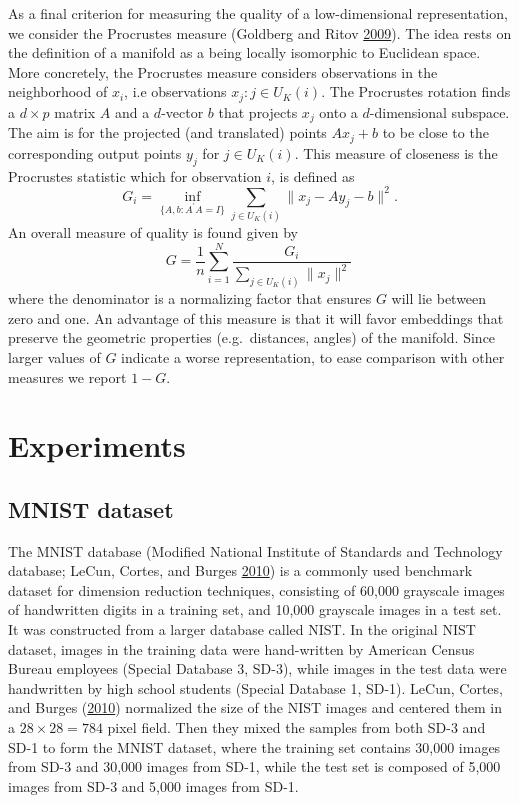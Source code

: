 \documentclass[12pt]{article}
\begin{document}
As a final criterion for measuring the quality of a low-dimensional representation, we consider the Procrustes measure (Goldberg and Ritov \protect\hyperlink{ref-Goldberg2009-tb}{2009}). The idea rests on the definition of a manifold as a being locally isomorphic to Euclidean space. More concretely, the Procrustes measure considers observations in the neighborhood of \(x_i\), i.e observations \(x_j:j\in U_K(i)\). The Procrustes rotation finds a \(d\times p\) matrix \(A\) and a \(d\)-vector \(b\) that projects \(x_j\) onto a \(d\)-dimensional subspace. The aim is for the projected (and translated) points \(Ax_j+b\) to be close to the corresponding output points \(y_j\) for \(j\in U_K(i)\). This measure of closeness is the Procrustes statistic which for observation \(i\), is defined as
\begin{equation}\label{eq:procstats}
  G_i= \inf _{\{A,b: A^{\prime} A=I\}} \sum_{j\in U_K(i)}\|x_{j}-A y_{j}-b\|^{2}.
\end{equation}
An overall measure of quality is found given by
\begin{equation}\label{eq:procmeasure}
  G=\frac{1}{n}\sum\limits_{i=1}^N\frac{G_i}{\sum_{j\in U_K(i)}\|x_{j}\|^{2}}\,
\end{equation}
where the denominator is a normalizing factor that ensures \(G\) will lie between zero and one. An advantage of this measure is that it will favor embeddings that preserve the geometric properties (e.g.~distances, angles) of the manifold. Since larger values of \(G\) indicate a worse representation, to ease comparison with other measures we report \(1-G\).

\hypertarget{experiment}{%
\section{Experiments}\label{experiment}}

\hypertarget{mnist-dataset}{%
\subsection{MNIST dataset}\label{mnist-dataset}}

The MNIST database (Modified National Institute of Standards and Technology database; LeCun, Cortes, and Burges \protect\hyperlink{ref-lecun2010mnist}{2010}) is a commonly used benchmark dataset for dimension reduction techniques, consisting of 60,000 grayscale images of handwritten digits in a training set, and 10,000 grayscale images in a test set. It was constructed from a larger database called NIST. In the original NIST dataset, images in the training data were hand-written by American Census Bureau employees (Special Database 3, SD-3), while images in the test data were handwritten by high school students (Special Database 1, SD-1). LeCun, Cortes, and Burges (\protect\hyperlink{ref-lecun2010mnist}{2010}) normalized the size of the NIST images and centered them in a \(28\times 28=784\) pixel field. Then they mixed the samples from both SD-3 and SD-1 to form the MNIST dataset, where the training set contains 30,000 images from SD-3 and 30,000 images from SD-1, while the test set is composed of 5,000 images from SD-3 and 5,000 images from SD-1.
\end{document}
